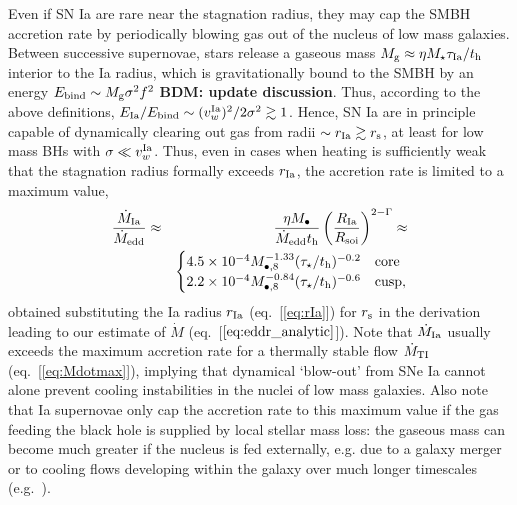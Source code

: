 \documentclass[usenatbib,fleqn]{mn2e}
\newcommand{\Mbheight}{M_{\bullet,8}}
\begin{document}

Even if SN Ia are rare near the stagnation radius, they may cap the
SMBH accretion rate by periodically blowing gas out of the nucleus of
low mass galaxies.  Between successive supernovae, stars release a
gaseous mass $M_{\rm g} \approx \eta M_{\star}\tau_{\rm Ia}/t_{\rm h}$
interior to the Ia radius, which is gravitationally bound to the SMBH
by an energy $E_{\rm bind} \sim M_{\rm g}\sigma^{2}f^{2}$  {\bf BDM: update discussion}.  Thus, according
to the above definitions, $E_{\rm Ia}/E_{\rm bind} \sim (v_{w}^{\rm
  Ia})^{2}/2\sigma^{2} \gtrsim 1$.  Hence, SN Ia are in principle
capable of dynamically clearing out gas from radii $\sim r_{\rm Ia}
\gtrsim r_{\rm s}$, at least for low mass BHs with $\sigma \ll v^{\rm
  Ia}_{w}$.  Thus, even in cases when heating is sufficiently weak
that the stagnation radius formally exceeds $r_{\rm Ia}$, the
accretion rate is limited to a maximum value,
\begin{eqnarray}
\frac{\dot{M}_{\rm Ia}}{\dot{M}_{\rm edd}} &\approx& \frac{\eta M_{\bullet}}{\dot{M}_{\rm edd} t_{\rm h}}\left(\frac{R_{\rm Ia}}{R_{\rm soi}}\right)^{2-\Gamma} \approx \nonumber \\
 && \begin{cases}
    4.5 \times 10^{-4} M_{\bullet,8}^{-1.33}(\tau_{\star}/t_{\rm h})^{-0.2}
   & \text{core} \\
    2.2 \times 10^{-4} \Mbheight^{-0.84}(\tau_{\star}/t_{\rm h})^{-0.6}   & \text{cusp},
  \end{cases}
  \label{eq:eddr_Ia}
\end{eqnarray}
obtained substituting the Ia radius $r_{\rm Ia}$ (eq.~[\ref{eq:rIa}]) for $r_{\rm s}$ in the derivation leading to our estimate of $\dot{M}$ (eq.~[$\ref{eq:eddr_analytic}$]).  Note that $\dot{M}_{\rm Ia}$ usually exceeds the maximum accretion rate for a thermally stable flow $\dot{M}_{\rm TI}$ (eq.~[\ref{eq:Mdotmax}]), implying that dynamical `blow-out' from SNe Ia cannot alone prevent cooling instabilities in the nuclei of low mass galaxies.  Also note that Ia supernovae only cap the accretion rate to this maximum value if the gas feeding the black hole is supplied by local stellar mass loss: the gaseous mass can become much greater if the nucleus is fed externally, e.g. due to a galaxy merger or to cooling flows developing within the galaxy over much longer timescales (e.g.~\citealt{Ciotti&Ostriker07}). 
\end{document}

